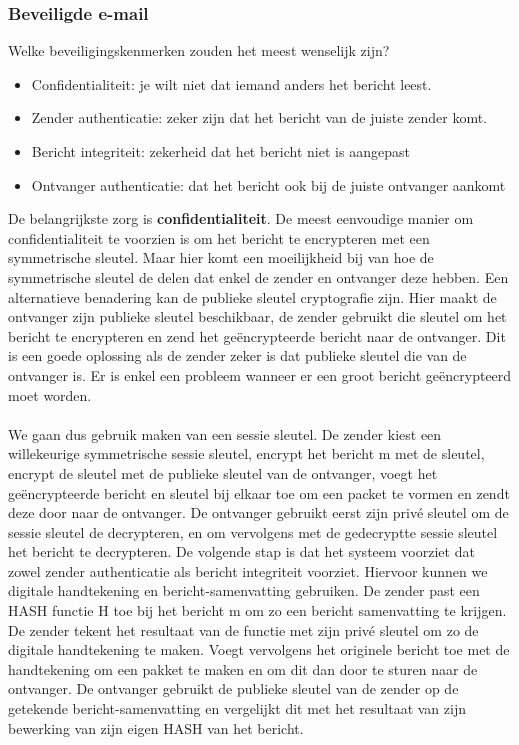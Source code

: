 \clearpage

\subsubsection{Beveiligde e-mail}

Welke beveiligingskenmerken zouden het meest wenselijk zijn?

\begin{itemize}
\item Confidentialiteit: je wilt niet dat iemand anders het bericht leest.
\item Zender authenticatie: zeker zijn dat het bericht van de juiste zender komt.
\item Bericht integriteit: zekerheid dat het bericht niet is aangepast
\item Ontvanger authenticatie: dat het bericht ook bij de juiste ontvanger aankomt
\end{itemize}

De belangrijkste zorg is \textbf{confidentialiteit}. De meest eenvoudige manier om confidentialiteit te voorzien is om het bericht te encrypteren met een symmetrische sleutel. Maar hier komt een moeilijkheid bij van hoe de symmetrische sleutel de delen dat enkel de zender en ontvanger deze hebben. 
Een alternatieve benadering kan de publieke sleutel cryptografie zijn. Hier maakt de ontvanger zijn publieke sleutel beschikbaar, de zender gebruikt die sleutel om het bericht te encrypteren en zend het geëncrypteerde bericht naar de ontvanger. Dit is een goede oplossing als de zender zeker is dat publieke sleutel die van de ontvanger is. Er is enkel een probleem wanneer er een groot bericht geëncrypteerd moet worden.
\\\\
We gaan dus gebruik maken van een sessie sleutel. De zender kiest een willekeurige symmetrische sessie sleutel, encrypt het bericht m met de sleutel, encrypt de sleutel met de publieke sleutel van de ontvanger, voegt het geëncrypteerde bericht en sleutel bij elkaar toe om een packet te vormen en zendt deze door naar de ontvanger. De ontvanger gebruikt eerst zijn privé sleutel om de sessie sleutel de decrypteren, en om vervolgens met de gedecryptte sessie sleutel het bericht te decrypteren.
De volgende stap is dat het systeem voorziet dat zowel zender authenticatie als bericht integriteit voorziet. Hiervoor kunnen we digitale handtekening en bericht-samenvatting gebruiken. De zender past een HASH functie H toe bij het bericht m om zo een bericht samenvatting te krijgen. De zender tekent het resultaat van de functie met zijn privé sleutel om zo de digitale handtekening te maken. Voegt vervolgens het originele bericht toe met de handtekening om een pakket te maken en om dit dan door te sturen naar de ontvanger. De ontvanger gebruikt de publieke sleutel van de zender op de getekende bericht-samenvatting en vergelijkt dit met het resultaat van zijn bewerking van zijn eigen HASH van het bericht.

